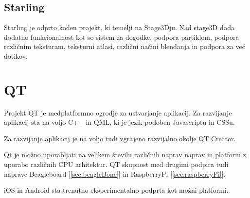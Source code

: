 \subsection{Starling}

Starling je odprto koden projekt, ki temelji na Stage3Dju. Nad stage3D doda dodatno funkcionalnost kot so sistem za dogodke, podpora partiklom, podpora različnim teksturam, teksturni atlasi, različni načini blendanja in podpora za več dotikov.

\section{QT}
\label{sec:qt}

Projekt QT je medplatformno ogrodje za ustvarjanje aplikacij. Za razvijanje aplikacij sta na voljo C++ in QML, ki je jezik podoben Javascriptu in CSSu.

Za razvijanje aplikacij je na voljo tudi vgrajeno razvijalno okolje QT Creator.

Qt je možno uporabljati na velikem številu različnih naprav naprav in platform z uporabo različnih CPU arhitektur. QT skupnost med drugimi podpira tudi naprave Beagleboard [\ref{sec:beagleBone}] in RaspberryPi [\ref{sec:raspberryPi}]. 

iOS in Android sta trenutno eksperimentalno podprta kot možni platformi.%